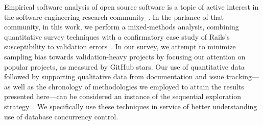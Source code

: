  Empirical software analysis of
open source software is a topic of active interest in the software
engineering research community~\cite{foss-icse}. In the parlance of
that community, in this work, we perform a mixed-methods analysis,
combining quantitative survey techniques with a confirmatory case
study of Rails's susceptibility to validation
errors~\cite{empiricalmethods}. In our survey, we attempt to minimize
sampling bias towards validation-heavy projects by focusing our
attention on popular projects, as measured by GitHub stars. Our use of
quantitative data followed by supporting qualitative data from
documentation and issue tracking---as well as the chronology of
methodologies we employed to attain the results presented here---can
be considered an instance of the sequential exploration
strategy~\cite{creswell2013research}. We specifically use these techniques in
service of better understanding use of database
concurrency control.
